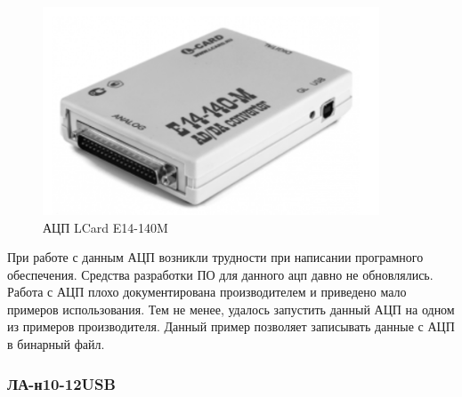 \documentclass[../paper.tex]{subfiles}
\begin{document}
\begin{figure}[H]
\centering
\includegraphics[width=10cm]{images/adc1}
\caption{АЦП LCard E14-140M}
\end{figure}

При работе с данным АЦП возникли трудности при написании програмного обеспечения. Средства разработки ПО для данного ацп давно не обновлялись. Работа с АЦП плохо документирована производителем и приведено мало примеров использования. Тем не менее, удалось запустить данный АЦП на одном из примеров производителя. Данный пример позволяет записывать данные с АЦП в бинарный файл.

\subsubsection{ЛА-н10-12USB}
\end{document}
